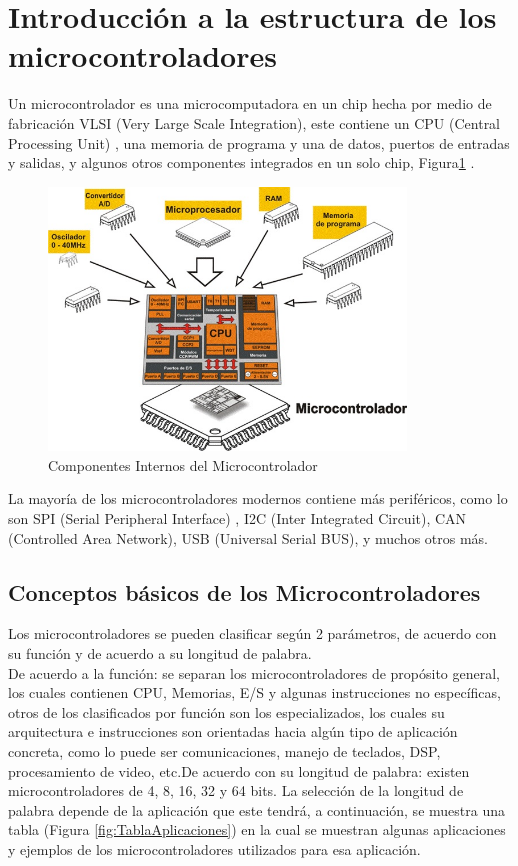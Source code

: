 \documentclass[12pt,a4paper]{article}
\begin{document}
   \newpage
   \tableofcontents
   \newpage
   \listoffigures
   \newpage
   
   \section{Introducción a la estructura de los microcontroladores}
   Un microcontrolador es una microcomputadora en un chip hecha por medio de fabricación VLSI (Very Large Scale Integration), este contiene un CPU (Central Processing Unit) , una memoria de programa y una de datos, puertos de entradas y salidas, y algunos otros componentes integrados en un solo chip, Figura\ref{fig:ComponentesMicrocontrolador}  \cite{Ravi}.
   
   \begin{figure}[htpb]
   \centering
   \includegraphics[height=7cm]{Figura1_1}
   \caption{Componentes Internos del Microcontrolador}
   \label{fig:ComponentesMicrocontrolador}
   \end{figure}
   
   La mayoría de los microcontroladores modernos contiene más periféricos, como lo son SPI (Serial Peripheral Interface) , I2C (Inter Integrated Circuit), CAN (Controlled Area Network), USB (Universal Serial BUS), y muchos otros más. 
   
   \subsection{Conceptos básicos de los Microcontroladores}
   Los microcontroladores se pueden clasificar según 2 parámetros, de acuerdo con su función y de acuerdo a su longitud de palabra.\\
   De acuerdo a la función: se separan los microcontroladores de propósito general, los cuales contienen CPU, Memorias, E/S y algunas instrucciones no específicas, otros de los clasificados por función son los especializados, los cuales su arquitectura e instrucciones son orientadas hacia algún tipo de aplicación concreta, como lo puede ser comunicaciones, manejo de teclados, DSP, procesamiento de video, etc.De acuerdo con su longitud de palabra: existen microcontroladores de 4, 8, 16, 32 y 64 bits. La selección de la longitud de palabra depende de la aplicación que este tendrá, a continuación, se muestra una tabla (Figura \ref{fig:TablaAplicaciones}) en la cual se muestran algunas aplicaciones y ejemplos de los microcontroladores utilizados para esa aplicación.
   
\end{document}
